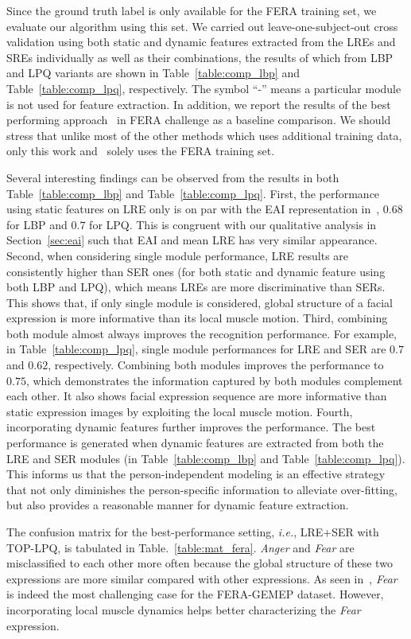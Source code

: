 \documentclass[journal]{IEEEtran}
\begin{document}
Since the ground truth label is only available for the FERA training set, we evaluate our algorithm using this set. We carried out leave-one-subject-out cross validation using both static and dynamic features extracted from the LREs and SREs individually as well as their combinations, the results of which from LBP and LPQ variants are shown in Table~\ref{table:comp_lbp} and Table~\ref{table:comp_lpq}, respectively. The symbol ``-'' means a particular module is not used for feature extraction. In addition, we report the results of the best performing approach~\cite{Yang_SMCB12} in FERA challenge as a baseline comparison. We should stress that unlike most of the other methods which uses additional training data, only this work and~\cite{Yang_SMCB12} solely uses the FERA training set. 

Several interesting findings can be observed from the results in both Table~\ref{table:comp_lbp} and Table~\ref{table:comp_lpq}. First, the performance using static features on LRE only is on par with the EAI representation in~\cite{Yang_SMCB12}, $0.68$ for LBP and $0.7$ for LPQ. This is congruent with our qualitative analysis in Section~\ref{sec:eai} such that EAI and mean LRE has very similar appearance. Second, when considering single module performance, LRE results are consistently higher than SER ones (for both static and dynamic feature using both LBP and LPQ), which means LREs are more discriminative than SERs. This shows that, if only single module is considered, global structure of a facial expression is more informative than its local muscle motion. Third, combining both module almost always improves the recognition performance. For example, in Table~\ref{table:comp_lpq}, single module performances for LRE and SER are $0.7$ and $0.62$, respectively. Combining both modules improves the performance to $0.75$, which demonstrates the information captured by both modules complement each other. It also shows facial expression sequence are more informative than static expression images by exploiting the local muscle motion. Fourth, incorporating dynamic features further improves the performance. The best performance is generated when dynamic features are extracted from both the LRE and SER modules (in Table~\ref{table:comp_lbp} and Table~\ref{table:comp_lpq}). This informs us that the person-independent modeling is an effective strategy that not only diminishes the person-specific information to alleviate over-fitting, but also provides a reasonable manner for dynamic feature extraction. 

The confusion matrix for the best-performance setting, \textit{i.e.}, LRE+SER with TOP-LPQ, is tabulated in Table.~\ref{table:mat_fera}. \textit{Anger} and \textit{Fear} are misclassified to each other more often because the global structure of these two expressions are more similar compared with other expressions. As seen in~\cite{Valstar12}, \textit{Fear} is indeed the most challenging case for the FERA-GEMEP dataset. However, incorporating local muscle dynamics helps better characterizing the \textit{Fear} expression. 
\end{document}
